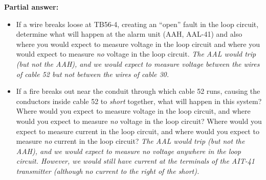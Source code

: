 





\noindent
{\bf Partial answer:}

\begin{itemize}
\item{} If a wire breaks loose at TB56-4, creating an ``open'' fault in the loop circuit, determine what will happen at the alarm unit (AAH, AAL-41) and also where you would expect to measure voltage in the loop circuit and where you would expect to measure {\it no} voltage in the loop circuit.  {\it The AAL would trip (but not the AAH), and we would expect to measure voltage between the wires of cable 52 but not between the wires of cable 30.}
\vskip 10pt
\item{} If a fire breaks out near the conduit through which cable 52 runs, causing the conductors inside cable 52 to {\it short} together, what will happen in this system?  Where would you expect to measure voltage in the loop circuit, and where would you expect to measure {\it no} voltage in the loop circuit?  Where would you expect to measure current in the loop circuit, and where would you expect to measure {\it no} current in the loop circuit?  {\it The AAL would trip (but not the AAH), and we would expect to measure no voltage anywhere in the loop circuit.  However, we would still have current at the terminals of the AIT-41 transmitter (although no current to the right of the short).}
\end{itemize}







